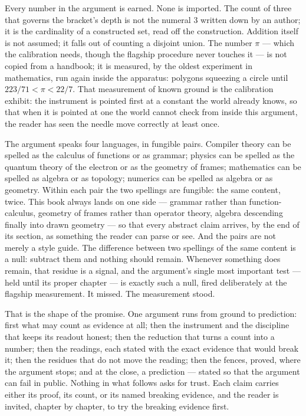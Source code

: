 Every number in the argument is earned. None is imported. The count of three that
governs the bracket's depth is not the numeral 3 written down by an author; it is the
cardinality of a constructed set, read off the construction. Addition itself is not
assumed; it falls out of counting a disjoint union. The number $\pi$ --- which the
calibration needs, though the flagship procedure never touches it --- is not copied
from a handbook; it is measured, by the oldest experiment
in mathematics, run again inside the apparatus: polygons squeezing a circle until
$223/71 < \pi < 22/7$. That measurement of known ground is the calibration exhibit: the
instrument is pointed first at a constant the world already knows, so that when it is
pointed at one the world cannot check from inside this argument, the reader has seen the
needle move correctly at least once.

The argument speaks four languages, in fungible pairs. Compiler theory can be spelled as
the calculus of functions or as grammar; physics can be spelled as the quantum theory of
the electron or as the geometry of frames; mathematics can be spelled as algebra or as
topology; numerics can be spelled as algebra or as geometry. Within each pair the two
spellings are fungible: the same content, twice. This book always lands on one side ---
grammar rather than function-calculus, geometry of frames rather than operator theory,
algebra descending finally into drawn geometry --- so that every abstract claim arrives,
by the end of its section, as something the reader can parse or see. And the pairs are
not merely a style guide. The difference between two spellings of the same content is a
null: subtract them and nothing should remain. Whenever something does remain, that
residue is a signal, and the argument's single most important test --- held until its
proper chapter --- is exactly such a null, fired deliberately at the flagship
measurement. It missed. The measurement stood.

That is the shape of the promise. One argument runs from ground to prediction: first
what may count as evidence at all; then the instrument and the discipline that keeps its
readout honest; then the reduction that turns a count into a number; then the readings,
each stated with the exact evidence that would break it; then the residues that do not
move the reading; then the fences, proved, where the argument stops; and at the close, a
prediction --- stated so that the argument can fail in public. Nothing in what follows
asks for trust. Each claim carries either its proof, its count, or its named breaking
evidence, and the reader is invited, chapter by chapter, to try the breaking evidence
first.

